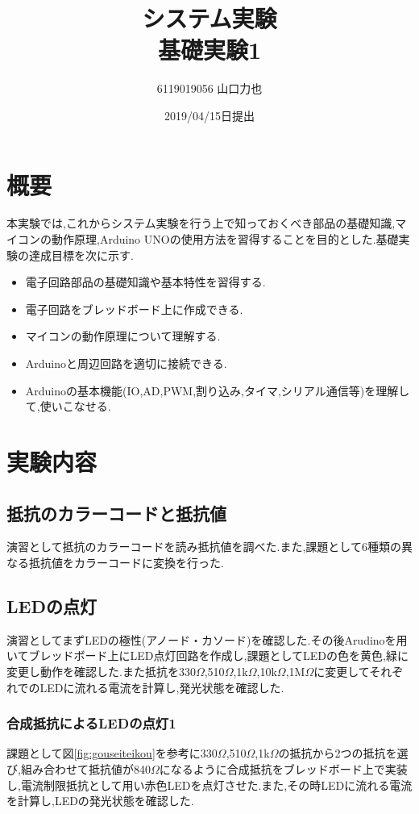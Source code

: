 \documentclass{jarticle}
\title{{システム実験}\\基礎実験1}
\author{6119019056 山口力也}
\date{2019/04/15日提出}
\begin{document}
\maketitle

\section{概要}
本実験では,これからシステム実験を行う上で知っておくべき部品の基礎知識,マイコンの動作原理,Arduino UNOの使用方法を習得することを目的とした.基礎実験の達成目標を次に示す.

\begin{itemize}

\item 電子回路部品の基礎知識や基本特性を習得する.
\item 電子回路をブレッドボード上に作成できる.
\item マイコンの動作原理について理解する.
\item Arduinoと周辺回路を適切に接続できる.
\item Arduinoの基本機能(IO,AD,PWM,割り込み,タイマ,シリアル通信等)を理解して,使いこなせる.

\end{itemize}

\section{実験内容}
\subsection{抵抗のカラーコードと抵抗値}
\label{subsec:colorcode}
演習として抵抗のカラーコードを読み抵抗値を調べた.また,課題として6種類の異なる抵抗値をカラーコードに変換を行った.
\subsection{LEDの点灯}
\label{subsec:led}
演習としてまずLEDの極性(アノード・カソード)を確認した.その後Arudinoを用いてブレッドボード上にLED点灯回路を作成し,課題としてLEDの色を黄色,緑に変更し動作を確認した.また抵抗を330$\Omega$,510$\Omega$,1k$\Omega$,10k$\Omega$,1M$\Omega$に変更してそれぞれでのLEDに流れる電流を計算し,発光状態を確認した.

\subsubsection{合成抵抗によるLEDの点灯1}
\label{subsubsec:gouseiled1}
課題として図\ref{fig:gouseiteikou}を参考に330$\Omega$,510$\Omega$,1k$\Omega$の抵抗から2つの抵抗を選び,組み合わせて抵抗値が840$\Omega$になるように合成抵抗をブレッドボード上で実装し,電流制限抵抗として用い赤色LEDを点灯させた.また,その時LEDに流れる電流を計算し,LEDの発光状態を確認した.
\end{document}

